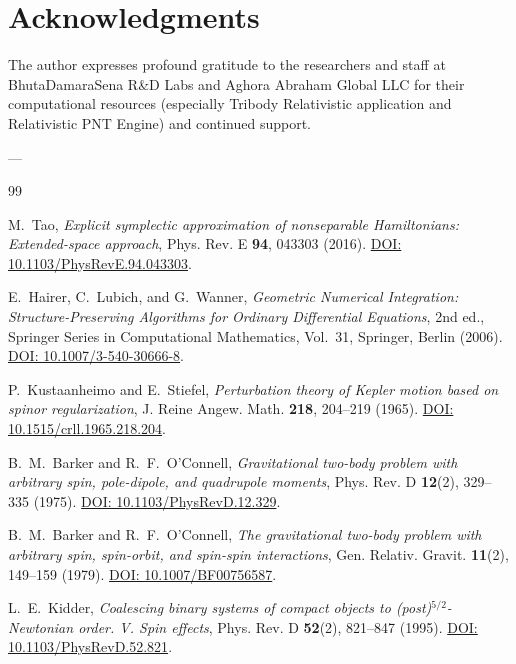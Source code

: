\documentclass[11pt,a4paper,reqno]{article}
\theoremstyle{plain}
\theoremstyle{definition}
\theoremstyle{remark}
\numberwithin{equation}{section}
\begin{document}
\section*{Acknowledgments}
The author expresses profound gratitude to the researchers and staff at BhutaDamaraSena R\&D Labs and Aghora Abraham Global LLC for their computational resources (especially Tribody Relativistic application and Relativistic PNT Engine) and continued support.

---

\begin{thebibliography}{99}

M.~Tao, \textit{Explicit symplectic approximation of nonseparable Hamiltonians: Extended-space approach}, Phys. Rev. E \textbf{94}, 043303 (2016). \href{https://doi.org/10.1103/PhysRevE.94.043303}{DOI: 10.1103/PhysRevE.94.043303}.

E.~Hairer, C.~Lubich, and G.~Wanner, \textit{Geometric Numerical Integration: Structure-Preserving Algorithms for Ordinary Differential Equations}, 2nd ed., Springer Series in Computational Mathematics, Vol.~31, Springer, Berlin (2006). \href{https://doi.org/10.1007/3-540-30666-8}{DOI: 10.1007/3-540-30666-8}.

P.~Kustaanheimo and E.~Stiefel, \textit{Perturbation theory of Kepler motion based on spinor regularization}, J. Reine Angew. Math. \textbf{218}, 204--219 (1965). \href{https://doi.org/10.1515/crll.1965.218.204}{DOI: 10.1515/crll.1965.218.204}.

B.~M.~Barker and R.~F.~O'Connell, \textit{Gravitational two-body problem with arbitrary spin, pole-dipole, and quadrupole moments}, Phys. Rev. D \textbf{12}(2), 329--335 (1975). \href{https://doi.org/10.1103/PhysRevD.12.329}{DOI: 10.1103/PhysRevD.12.329}.

B.~M.~Barker and R.~F.~O'Connell, \textit{The gravitational two-body problem with arbitrary spin, spin-orbit, and spin-spin interactions}, Gen. Relativ. Gravit. \textbf{11}(2), 149--159 (1979). \href{https://doi.org/10.1007/BF00756587}{DOI: 10.1007/BF00756587}.

L.~E.~Kidder, \textit{Coalescing binary systems of compact objects to (post)$^{5/2}$-Newtonian order. V. Spin effects}, Phys. Rev. D \textbf{52}(2), 821--847 (1995). \href{https://doi.org/10.1103/PhysRevD.52.821}{DOI: 10.1103/PhysRevD.52.821}.


\end{thebibliography}
\end{document}
